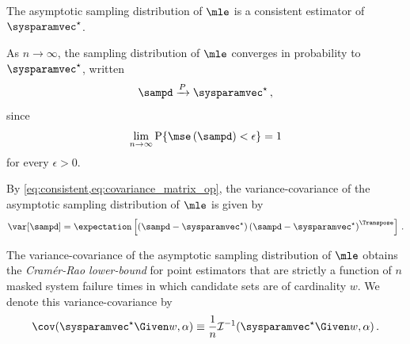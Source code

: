 \documentclass[ ../main.tex]{subfiles}
\begin{document}
\fussy
\begin{algorithm}[H]
\DontPrintSemicolon
{}
\BlankLine
{}
\caption{Generative model of the maximum likelihood estimator conditioned on $w$ candidates}
\label{alg:samp_d_gen_model}
\end{algorithm}

The asymptotic sampling distribution of $\mle$ is a consistent estimator of $\tparam\sysparamvec$.
\begin{postulate}
\label{def:consistent}
    As $n \to \infty$, the sampling distribution of $\mle$ converges in probability to $\tparam{\sysparamvec}$, written
    \begin{equation}
    \label{eq:consistent}
        \sampd \xrightarrow{P} \tparam{\sysparamvec}\,,
    \end{equation}
    since
    \begin{equation}
    \lim_{n \to \infty} \Prob{\mse\left(\sampd\right) < \epsilon} = 1
    \end{equation}
    for every $\epsilon > 0$.
\end{postulate}

By \cref{eq:consistent,eq:covariance_matrix_op}, the variance-covariance of the asymptotic sampling distribution of $\mle$ is given by
\begin{equation}
\label{def:asym_covariance_matrix}
    \var\!\left[\sampd\right] = \expectation
    \left[
        \left(\sampd - \tparam\sysparamvec \right)
        \left(\sampd - \tparam\sysparamvec \right)^{\Transpose}
    \right]\,.
\end{equation}

\begin{postulate}
The variance-covariance of the asymptotic sampling distribution of $\mle$ obtains the \emph{Cram\'{e}r-Rao lower-bound} for point estimators that are strictly a function of $n$ masked system failure times in which candidate sets are of cardinality $w$. We denote this variance-covariance by
\begin{equation}
    \cov(\tparam\sysparamvec \Given w, \alpha) \equiv \frac{1}{n} \infomatrx^{-1}(\tparam\sysparamvec\Given w, \alpha)\,.
\end{equation}
\end{postulate}
\end{document}
